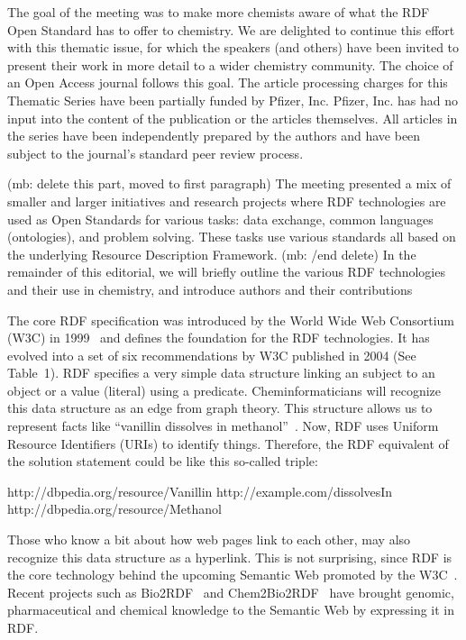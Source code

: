 \documentclass[10pt]{bmc_article}
\newenvironment{bmcformat}{\begin{raggedright}\baselineskip20pt\sloppy\setboolean{publ}{false}}{\end{raggedright}\baselineskip20pt\sloppy}
\begin{document}
\begin{bmcformat}
The goal of the meeting was to make more chemists aware of what the RDF Open
Standard has to offer to chemistry. We are delighted to continue this effort
with this thematic issue, for which the speakers (and others) have been invited
to present their work in more detail to a wider chemistry community. The choice
of an Open Access journal follows this goal. The article processing charges for
this Thematic Series have been partially funded by Pfizer, Inc.  Pfizer, Inc.
has had no input into the content of the publication or the articles themselves.
 All articles in the series have been independently prepared by the authors and
have been subject to the journal's standard peer review process.

(mb: delete this part, moved to first paragraph) The meeting presented a mix of
smaller and larger initiatives and research projects where RDF technologies are
used as Open Standards for various tasks: data exchange, common languages
(ontologies), and problem solving. These tasks use various standards all based
on the underlying Resource Description Framework. (mb: /end delete)  In the
remainder of this editorial, we will briefly outline the various RDF
technologies and their use in chemistry, and introduce authors and their
contributions  

The core RDF specification was introduced by the World Wide Web Consortium (W3C)
in 1999~\cite{RDF1999} and defines the foundation for the RDF technologies. It has
evolved into a set of six recommendations by W3C published in 2004
(See Table~1). 
RDF specifies a very simple data structure linking an subject to an object or a
value (literal) using a predicate. Cheminformaticians will recognize this data
structure as an edge from graph theory. This structure allows us to represent
facts like “vanillin dissolves in methanol”~\cite{ONS2010}. Now, RDF uses Uniform
Resource Identifiers (URIs) to identify things. Therefore, the RDF equivalent of
the solution statement could be like this so-called triple:

http://dbpedia.org/resource/Vanillin http://example.com/dissolvesIn http://dbpedia.org/resource/Methanol

Those who know a bit about how web pages link to each other, may also recognize
this data structure as a hyperlink. This is not surprising, since RDF is the
core technology behind the upcoming Semantic Web promoted by the
W3C~\cite{BER2001}. Recent projects such as Bio2RDF~\cite{BEL2008} and
Chem2Bio2RDF~\cite{CHE2010} have brought genomic, pharmaceutical and chemical knowledge to the
Semantic Web by expressing it in RDF.


\end{bmcformat}
\end{document}
